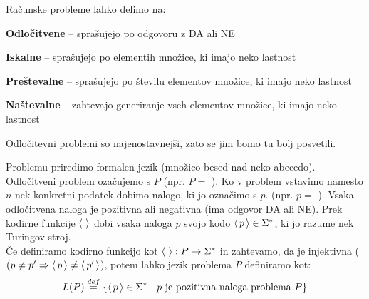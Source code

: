 \documentclass[10pt,a4paper,oneside]{book}
\begin{document}
Računske probleme lahko delimo na:
\begin{items}
\item \textbf{Odločitvene} -- sprašujejo po odgovoru z DA ali NE %
\item \textbf{Iskalne} -- sprašujejo po elementih množice, ki imajo neko lastnost
\item \textbf{Preštevalne} -- sprašujejo po številu elementov množice, ki imajo neko lastnost
\item \textbf{Naštevalne} -- zahtevajo generiranje vseh elementov množice, ki imajo neko lastnost
\end{items}
Odločitevni problemi so najenostavnejši, zato se jim bomo tu bolj posvetili.

Problemu priredimo formalen jezik (množico besed nad neko abecedo).
\br
Odločitveni problem ozačujemo s $P$ (npr. $P=$ ). Ko v problem vstavimo namesto $n$ nek konkretni podatek dobimo nalogo, ki jo označimo s $p$. (npr. $p=$ ). Vsaka odločitvena naloga je pozitivna ali negativna (ima odgovor DA ali NE).
Prek kodirne funkcije $\langle\,{}\,\rangle$ dobi vsaka naloga $p$ svojo kodo $\langle\,{p}\,\rangle\in\Sigma^*$, ki jo razume nek Turingov stroj.\\
Če definiramo kodirno funkcijo kot $\langle\,{}\,\rangle : P \rightarrow \Sigma^*$ in zahtevamo, da je injektivna ($(p \neq p' \Rightarrow \langle\,{p}\,\rangle \neq \langle\,{p'}\,\rangle$), potem lahko jezik problema $P$ definiramo kot:
\[ L(P) \overset{def}{=} \{ \langle\,{p}\,\rangle\in\Sigma^* \ | \  p \mbox{ je pozitivna naloga problema } P \} \]

\end{document}
